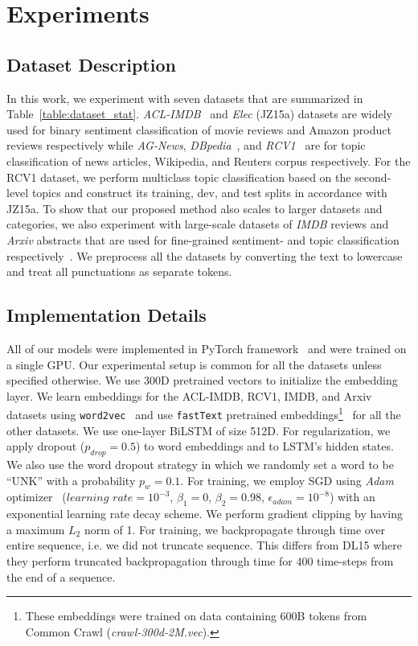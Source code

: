 \documentclass[letterpaper]{article}
\newcommand{\citep}{\cite}
\begin{document}
\section{Experiments}\label{sec:exp_setup}
\subsection*{Dataset Description}
In this work, we experiment with seven datasets that are summarized in Table~\ref{table:dataset_stat}. \emph{ACL-IMDB}~\citep{maas-EtAl:2011:ACL-HLT2011} and \emph{Elec} (JZ15a) datasets are widely used for binary sentiment classification of movie reviews and Amazon product reviews respectively while \emph{AG-News}, \emph{DBpedia}~\citep{zhang2015character}, and \emph{RCV1}~\citep{lewis2004rcv1} are for topic classification of news articles, Wikipedia, and Reuters corpus respectively. For the RCV1 dataset, we perform multiclass topic classification based on the second-level topics and construct its training, dev, and test splits in accordance with JZ15a. To show that our proposed method also scales to larger datasets and categories, we also experiment with large-scale datasets of \emph{IMDB} reviews and \emph{Arxiv} abstracts that are used for fine-grained sentiment- and topic classification respectively~\citep{sachan2018investigating}. We preprocess all the datasets by converting the text to lowercase and treat all punctuations as separate tokens.

\subsection*{Implementation Details}
All of our models were implemented in PyTorch framework~\citep{paszke2017automatic} and were trained on a single GPU. Our experimental setup is common for all the datasets unless specified otherwise. We use 300D pretrained vectors to initialize the embedding layer. We learn embeddings for the ACL-IMDB, RCV1, IMDB, and Arxiv datasets using \verb+word2vec+~\citep{mikolov2013distributed} and use \verb+fastText+ pretrained embeddings\footnote{These embeddings were trained on data containing 600B tokens from Common Crawl (\emph{crawl-300d-2M.vec}).}~\citep{mikolov2018advances} for all the other datasets. We use one-layer BiLSTM of size 512D. For regularization, we apply dropout ($p_{drop}=0.5$) to word embeddings and to LSTM's hidden states. We also use the word dropout strategy in which we randomly set a word to be ``UNK'' with a probability $p_w=0.1$. For training, we employ SGD using \emph{Adam} optimizer~\citep{DBLP:journals/corr/KingmaB14} ($\textit{learning rate}=10^{-3}$, $\beta_1=0$, $\beta_2=0.98$, $\epsilon_{\textit{adam}}=10^{-8}$) with an exponential learning rate decay scheme. We perform gradient clipping by having a maximum $L_2$ norm of 1. For training, we backpropagate through time over entire sequence, i.e. we did not truncate sequence. This differs  from DL15  where they perform truncated backpropagation through time for 400 time-steps from the end of a sequence.
\end{document}
